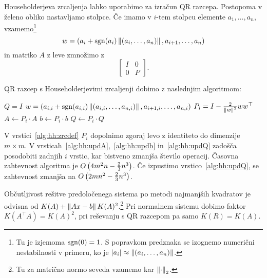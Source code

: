 \begin{opomba}
Householderjeva zrcaljenja lahko uporabimo za izračun QR razcepa.
Postopoma v želeno obliko nastavljamo stolpce. Če imamo v $i$-tem
stolpcu elemente $a_1, \dots, a_n$, vzamemo\footnote{Tu je
izjemoma $\operatorname{sgn}(0) = 1$. S popravkom predznaka se izognemo numerični
nestabilnosti v primeru, ko je
$\left\lvert a_i\right\rvert \approx \left\lVert (a_i, \dots, a_n)\right\rVert$.}
\[
w =
\left(a_i + \operatorname{sgn}(a_i) \left\lVert (a_i, \dots, a_n)\right\rVert, a_{i+1}, \dots, a_n\right)
\]
in matriko $A$ z leve zmnožimo z
\[
\begin{bmatrix}
I & 0 \\
0 & P
\end{bmatrix}.
\]
\end{opomba}

\begin{opomba}
QR razcep s Householderjevimi zrcaljenji dobimo z naslednjim
algoritmom:

\begin{algorithmic}[1]
\State $Q=I$
  \State $w = \left(a_{i,i} + \operatorname{sgn}(a_{i,i})
  \left\lVert (a_{i,i}, \dots, a_{n,i})\right\rVert, a_{i+1,i}, \dots, a_{n,i}\right)$
  \State $P_i = I - \frac{2}{\left\lVert w\right\rVert^2} ww^\top$
  \label{alg:hh:zrcdef}
  \State $A \gets P_i \cdot A$
  \label{alg:hh:updA}
  \State $b \gets P_i \cdot b$
  \label{alg:hh:updb}
  \State $Q \gets P_i \cdot Q$
  \label{alg:hh:updQ}
\EndFor
\end{algorithmic}
V vrstici~\ref{alg:hh:zrcdef} $P_i$ dopolnimo zgoraj levo z
identiteto do dimenzije $m \times m$. V
vrsticah~\ref{alg:hh:updA},~\ref{alg:hh:updb} in~\ref{alg:hh:updQ}
zadošča posodobiti zadnjih $i$ vrstic, kar bistveno zmanjša
število operacij. Časovna zahtevnost algoritma je
$O \left(4m^2n - \frac{2}{3} n^3\right)$. Če izpustimo
vrstico~\ref{alg:hh:updQ}, se zahtevnost zmanjša na
$O \left(2mn^2 - \frac{2}{3} n^3\right)$.
\end{opomba}

\begin{opomba}
Občutljivost rešitve predoločenega sistema po metodi najmanjših
kvadratov je odvisna od $K(A) + \left\lVert Ax - b\right\rVert K(A)^2$.\footnote{Tu
za matrično normo seveda vzamemo kar $\left\lVert \cdot\right\rVert_2$.} Pri
normalnem sistemu dobimo faktor $K(A^\top A) = K(A)^2$, pri
reševanju s QR razcepom pa samo $K(R) = K(A)$.
\end{opomba}
